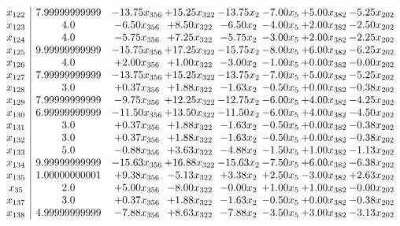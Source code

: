 \documentclass[8pt]{article}
\begin{document}
\[\begin{array}{c| c c@{\hskip 2pt} c@{\hskip 2pt} c@{\hskip 2pt} c@{\hskip 2pt} c@{\hskip 2pt} c@{\hskip 2pt} }
 x_{122}   &  7.99999999999 & -13.75 x_{356} & + 15.25 x_{322} & -13.75 x_{2} & -7.00 x_{5} & +  5.00 x_{382} & -5.25 x_{202}\\
 x_{123}   &  4.0 & -6.50 x_{356} & +  8.50 x_{322} & -6.50 x_{2} & -4.00 x_{5} & +  2.00 x_{382} & -2.50 x_{202}\\
 x_{124}   &  4.0 & -5.75 x_{356} & +  7.25 x_{322} & -5.75 x_{2} & -3.00 x_{5} & +  2.00 x_{382} & -2.25 x_{202}\\
 x_{125}   &  9.99999999999 & -15.75 x_{356} & + 17.25 x_{322} & -15.75 x_{2} & -8.00 x_{5} & +  6.00 x_{382} & -6.25 x_{202}\\
 x_{126}   &  4.0 & +  2.00 x_{356} & +  1.00 x_{322} & -3.00 x_{2} & -1.00 x_{5} & +  0.00 x_{382} & -0.00 x_{202}\\
 x_{127}   &  7.99999999999 & -13.75 x_{356} & + 15.25 x_{322} & -13.75 x_{2} & -7.00 x_{5} & +  5.00 x_{382} & -5.25 x_{202}\\
 x_{128}   &  3.0 & +  0.37 x_{356} & +  1.88 x_{322} & -1.63 x_{2} & -0.50 x_{5} & +  0.00 x_{382} & -0.38 x_{202}\\
 x_{129}   &  7.99999999999 & -9.75 x_{356} & + 12.25 x_{322} & -12.75 x_{2} & -6.00 x_{5} & +  4.00 x_{382} & -4.25 x_{202}\\
 x_{130}   &  6.99999999999 & -11.50 x_{356} & + 13.50 x_{322} & -11.50 x_{2} & -6.00 x_{5} & +  4.00 x_{382} & -4.50 x_{202}\\
 x_{131}   &  3.0 & +  0.37 x_{356} & +  1.88 x_{322} & -1.63 x_{2} & -0.50 x_{5} & +  0.00 x_{382} & -0.38 x_{202}\\
 x_{132}   &  3.0 & +  0.37 x_{356} & +  1.88 x_{322} & -1.63 x_{2} & -0.50 x_{5} & +  0.00 x_{382} & -0.38 x_{202}\\
 x_{133}   &  5.0 & -0.88 x_{356} & +  3.63 x_{322} & -4.88 x_{2} & -1.50 x_{5} & +  1.00 x_{382} & -1.13 x_{202}\\
 x_{134}   &  9.99999999999 & -15.63 x_{356} & + 16.88 x_{322} & -15.63 x_{2} & -7.50 x_{5} & +  6.00 x_{382} & -6.38 x_{202}\\
 x_{135}   &  1.00000000001 & +  9.38 x_{356} & -5.13 x_{322} & +  3.38 x_{2} & +  2.50 x_{5} & -3.00 x_{382} & +  2.63 x_{202}\\
 x_{35}   &  2.0 & +  5.00 x_{356} & -8.00 x_{322} & -0.00 x_{2} & +  1.00 x_{5} & +  1.00 x_{382} & -0.00 x_{202}\\
 x_{137}   &  3.0 & +  0.37 x_{356} & +  1.88 x_{322} & -1.63 x_{2} & -0.50 x_{5} & +  0.00 x_{382} & -0.38 x_{202}\\
 x_{138}   &  4.99999999999 & -7.88 x_{356} & +  8.63 x_{322} & -7.88 x_{2} & -3.50 x_{5} & +  3.00 x_{382} & -3.13 x_{202}\\

\end{array}\]
\end{document}
